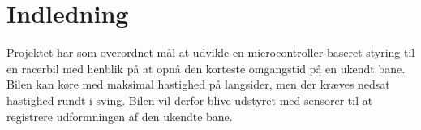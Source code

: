 \section{Indledning}

Projektet har som overordnet mål at udvikle en microcontroller-baseret styring til en racerbil med henblik på at opnå den korteste omgangstid på en ukendt bane. Bilen kan køre med maksimal hastighed på langsider, men der kræves nedsat hastighed rundt i sving. Bilen vil derfor blive udstyret med sensorer til at registrere udformningen af den ukendte bane. 

\newpage
